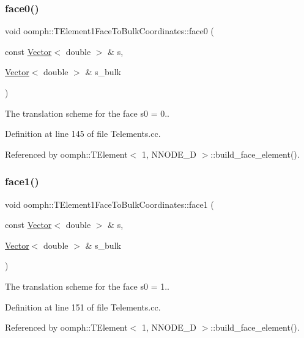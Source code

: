 \subsubsection{\texorpdfstring{face0()}{face0()}}
{\footnotesize\ttfamily void oomph\+::\+T\+Element1\+Face\+To\+Bulk\+Coordinates\+::face0 (\begin{DoxyParamCaption}\item[{const \hyperlink{classoomph_1_1Vector}{Vector}$<$ double $>$ \&}]{s,  }\item[{\hyperlink{classoomph_1_1Vector}{Vector}$<$ double $>$ \&}]{s\+\_\+bulk }\end{DoxyParamCaption})}



The translation scheme for the face s0 = 0.. 



Definition at line 145 of file Telements.\+cc.



Referenced by oomph\+::\+T\+Element$<$ 1, N\+N\+O\+D\+E\+\_\+D $>$\+::build\+\_\+face\+\_\+element().

\mbox{\label{namespaceoomph_1_1TElement1FaceToBulkCoordinates_a951b607f4bfb58490da5f1892974c202}} 
\subsubsection{\texorpdfstring{face1()}{face1()}}
{\footnotesize\ttfamily void oomph\+::\+T\+Element1\+Face\+To\+Bulk\+Coordinates\+::face1 (\begin{DoxyParamCaption}\item[{const \hyperlink{classoomph_1_1Vector}{Vector}$<$ double $>$ \&}]{s,  }\item[{\hyperlink{classoomph_1_1Vector}{Vector}$<$ double $>$ \&}]{s\+\_\+bulk }\end{DoxyParamCaption})}



The translation scheme for the face s0 = 1.. 



Definition at line 151 of file Telements.\+cc.



Referenced by oomph\+::\+T\+Element$<$ 1, N\+N\+O\+D\+E\+\_\+D $>$\+::build\+\_\+face\+\_\+element().

